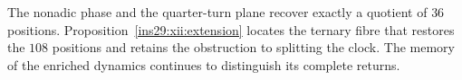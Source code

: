 The nonadic phase and the quarter-turn plane recover exactly a quotient
of \(36\) positions. Proposition~\ref{ins29:xii:extension} locates the
ternary fibre that restores the \(108\) positions and retains the
obstruction to splitting the clock. The memory of the enriched dynamics
continues to distinguish its complete returns.


